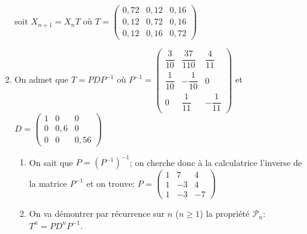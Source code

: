 \documentclass[12pt]{article}
\begin{document}
\begin{enumerate}
soit $X_{n+1}=X_{n}T$ où 
$T=
\begin{pmatrix} 
0,72 & 0,12 & 0,16 \\
0,12 & 0,72 & 0,16 \\
0,12 & 0,16 & 0,72 
\end{pmatrix}$

%
%
%
%
%
%

\item
On admet que $T=PDP^{-1}$ où
$P^{-1}=
\begin{pmatrix} 
\dfrac{3}{10} & \dfrac{37}{110} & \dfrac{4}{11} \\[7pt]
\dfrac{1}{10} & -\dfrac{1}{10} & 0 \\[7pt]
0 			  & \dfrac{1}{11} & -\dfrac{1}{11} 
\end{pmatrix}$
et
$D=
\begin{pmatrix} 
1 & 0 & 0 \\
0 & 0,6 & 0 \\
0 & 0 & 0,56 
\end{pmatrix}$

\begin{enumerate}
\item On sait que $P=\left (P^{-1}\right )^{-1}$; on cherche donc à la calculatrice l'inverse de la matrice $P^{-1}$ et on trouve:
$P=
\begin{pmatrix} 
1 & 7 & 4 \\
1 & -3 & 4 \\
1 & -3 & -7 
\end{pmatrix}$


\item On va démontrer par récurrence sur $n$ ($n \geqslant 1$) la propriété $\mathcal P_n$: $T^n=PD^nP^{-1}$.


\end{enumerate}
\end{enumerate}
\end{document}
